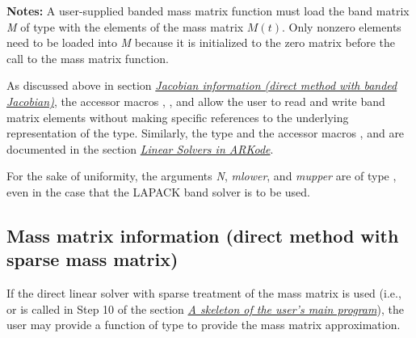 \documentclass[letterpaper,10pt,english]{sphinxmanual}
\begin{document}
\begin{fulllineitems}
\textbf{Notes:} A user-supplied banded mass matrix function must load
the band matrix \emph{M} of type  with the elements of the
mass matrix $M(t)$. Only nonzero elements need to be loaded
into \emph{M} because it is initialized to the zero matrix before the
call to the mass matrix function.

As discussed above in section {\hyperref[c_interface/User_supplied:cinterface-bandjacobianfn]{\emph{Jacobian information (direct method with banded Jacobian)}}},
the accessor macros , , and
 allow the user to read and write band matrix
elements without making specific references to the underlying
representation of the  type.  Similarly, the 
type and the accessor macros ,  and
 are documented in the section
{\hyperref[linear_solvers/index:linearsolvers]{\emph{Linear Solvers in ARKode}}}.

For the sake of uniformity, the arguments \emph{N}, \emph{mlower}, and
\emph{mupper} are of type , even in the case that the
LAPACK band solver is to be used.

\end{fulllineitems}



\subsection{Mass matrix information (direct method with sparse mass matrix)}
\label{c_interface/User_supplied:mass-matrix-information-direct-method-with-sparse-mass-matrix}\label{c_interface/User_supplied:cinterface-sparsemassfn}
If the direct linear solver with sparse treatment of the mass matrix
is used (i.e., {\hyperref[c_interface/User_callable:ARKMassKLU]{}} or {\hyperref[c_interface/User_callable:ARKMassSuperLUMT]{}}
is called in Step 10 of the section {\hyperref[c_interface/Skeleton:cinterface-skeleton]{\emph{A skeleton of the user's main program}}}), the
user may provide a function of type {\hyperref[c_interface/User_supplied:ARKSlsSparseMassFn]{}} to
provide the mass matrix approximation.
\end{document}
